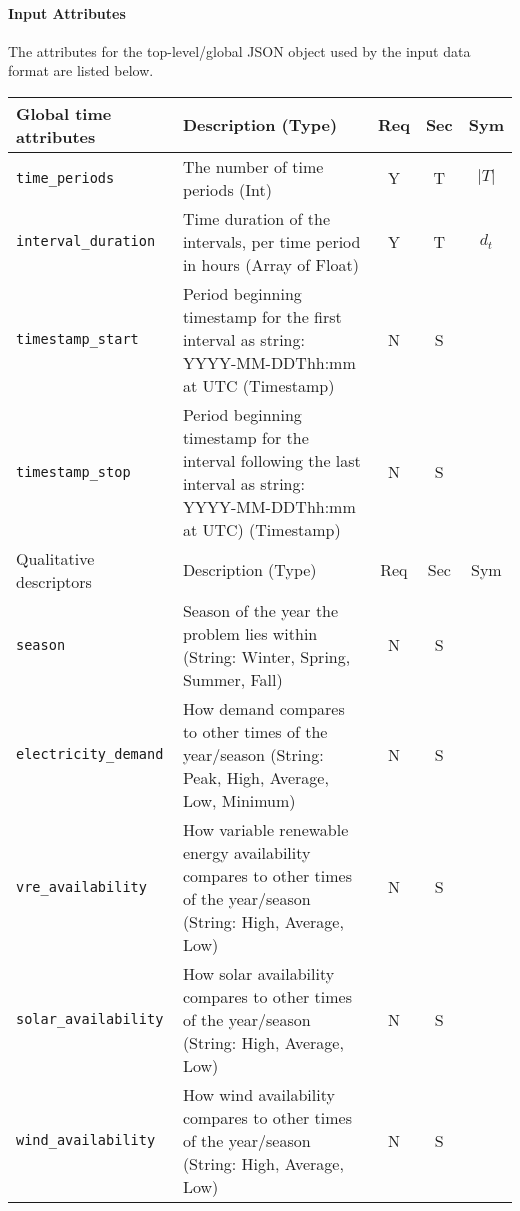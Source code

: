 \documentclass{article}
\begin{document}
\paragraph{Input Attributes}
The attributes for the top-level/global JSON object
used by the input data format are listed below.

\begin{center}
\small
\begin{tabular}{ l | p{3.5in} | c | c | c |}
Global time attributes & Description (Type) & Req & Sec & Sym\\
\hline
  {\tt time\_periods} & The number of time periods (Int) & Y & T & $\lvert T \rvert$ \\
  {\tt interval\_duration} & Time duration of the intervals, per time period in hours (Array of Float) & Y & T & $d_t$ \\
                           \hline
    {\tt timestamp\_start} & Period beginning timestamp for the first interval as string: YYYY-MM-DDThh:mm at UTC (Timestamp)& N & S & \\
    {\tt timestamp\_stop} & Period beginning timestamp for the interval following the last interval as string: YYYY-MM-DDThh:mm at UTC) (Timestamp)& N & S & \\
\hline
Qualitative descriptors & Description (Type) & Req & Sec & Sym\\
\hline
  {\tt season} & Season of the year the problem lies within (String: Winter, Spring, Summer, Fall) & N & S & \\
  {\tt electricity\_demand} & How demand compares to other times of the year/season (String: Peak, High, Average, Low, Minimum) & N & S & \\
  {\tt vre\_availability} & How variable renewable energy availability compares to other times of the year/season (String: High, Average, Low) & N & S & \\
  {\tt solar\_availability} & How solar availability compares to other times of the year/season (String: High, Average, Low) & N & S & \\
  {\tt wind\_availability} & How wind availability compares to other times of the year/season (String: High, Average, Low) & N & S & \\

\end{tabular}
\end{center}
\end{document}
